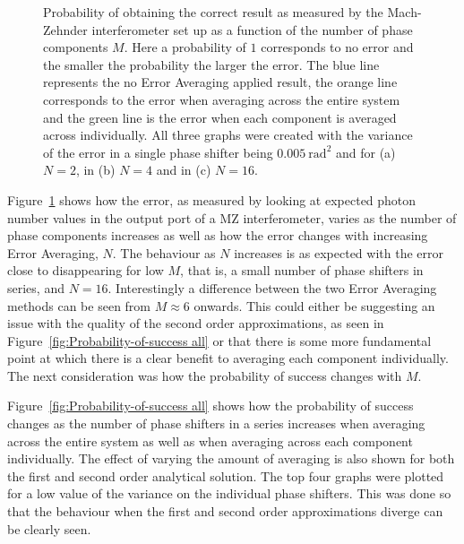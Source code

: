 \documentclass[aps,pra,twocolumn,superscriptaddress,numerical,floatfix]{revtex4-1}
\begin{document}
\begin{figure}
	\caption[Prob correct for phase systems]{Probability of obtaining the correct result as measured by the Mach-Zehnder interferometer set up as a function of the number of phase components $M$. Here a probability of $1$ corresponds to no error and the smaller the probability the larger the error. The blue line represents the no Error Averaging applied result, the orange line corresponds to the error when averaging across the entire system and the green line is the error when each component is averaged across individually. All three graphs were created with the variance of the error in a single phase shifter being $0.005\ \textrm{rad}^{2}$ and for (a) $N=2$, in (b) $N=4$ and in (c) $N=16$. \label{fig:Error-as-measured all}}
\end{figure}
%
Figure~\ref{fig:Error-as-measured all} shows how the error, as measured by looking at expected photon number values in the output port of a MZ interferometer, varies as the number of phase components increases as well as how the error changes with increasing Error Averaging, $N$. The behaviour as $N$ increases is as expected with the error close to disappearing for low $M$, that is, a small number of phase shifters in series, and $N=16$. Interestingly a difference between the two Error Averaging methods can be seen from $M\approx6$ onwards. This could either be suggesting an issue with the quality of the second order approximations, as seen in Figure~\ref{fig:Probability-of-success all} or that there is some more fundamental point at which there is a clear benefit to averaging each component individually. The next consideration was how the probability of success changes with $M$.

Figure~\ref{fig:Probability-of-success all} shows how the probability of success changes as the number of phase shifters in a series increases when averaging across the entire system as well as when averaging across each component individually. The effect of varying the amount of averaging is also shown for both the first and second order analytical solution. The top four graphs were plotted for a low value of the variance on the individual phase shifters. This was done so that the behaviour when the first and second order approximations diverge can be clearly seen. 
\end{document}
